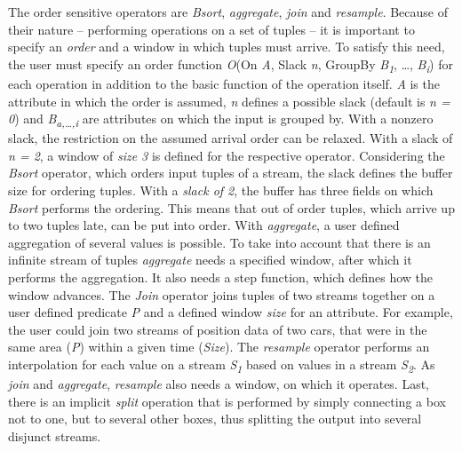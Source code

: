 The order sensitive operators are \textit{Bsort},\textit{ aggregate}, \textit{join} and \textit{resample}. Because of their nature – performing operations on a set of tuples – it is important to specify an \textit{order} and a window in which tuples must arrive. To satisfy this need, the user must specify an order function \textit{O}(On \textit{A}, Slack \textit{n}, GroupBy \textit{B\textsubscript{1}}, …, \textit{B\textsubscript{i}}) for each operation in addition to the basic function of the operation itself. \textit{A} is the attribute in which the order is assumed, \textit{n} defines a possible slack (default is \textit{n = 0}) and \textit{B\textsubscript{a,…,i}} are attributes on which the input is grouped by. With a nonzero slack, the restriction on the assumed arrival order can be relaxed. With a slack of \textit{n = 2}, a window of \textit{size 3} is defined for the respective operator. Considering the \textit{Bsort} operator, which orders input tuples of a stream, the slack defines the buffer size for ordering tuples. With a \textit{slack of 2}, the buffer has three fields on which \textit{Bsort} performs the ordering. This means that out of order tuples, which arrive up to two tuples late, can be put into order. With \textit{aggregate}, a user defined aggregation of several values is possible. To take into account that there is an infinite stream of tuples \textit{aggregate} needs a specified window, after which it performs the aggregation. It also needs a step function, which defines how the window advances. The \textit{Join} operator joins tuples of two streams together on a user defined predicate \textit{P} and a defined window \textit{size} for an attribute. For example, the user could join two streams of position data of two cars, that were in the same area (\textit{P}) within a given time (\textit{Size}). The \textit{resample} operator performs an interpolation for each value on a stream \textit{S\textsubscript{1}} based on values in a stream \textit{S\textsubscript{2}}. As \textit{join} and \textit{aggregate}, \textit{resample} also needs a window, on which it operates. Last, there is an implicit \textit{split} operation that is performed by simply connecting a box not to one, but to several other boxes, thus splitting the output into several disjunct streams.

